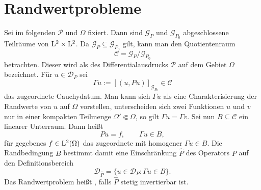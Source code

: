 \section{Randwertprobleme}
Sei im folgenden $\mathcal P$ und $\Omega$ fixiert. Dann sind  $\mathcal G_P$ und $\mathcal G_{P_0}$ abgeschlossene Teilräume von $\mathrm L^2\times\mathrm L^2$. Da
$\mathcal G_P\subseteq \mathcal G_{P_0}$ gilt, kann man den Quotientenraum
\begin{equation}
   \mathcal C = \mathcal G_P / \mathcal G_{P_0}
\end{equation}
betrachten. Dieser wird als  des Differentialausdrucks $\mathcal P$ auf dem Gebiet $\Omega$ bezeichnet. Für $u\in\mathcal D_P$ sei
\begin{equation}
     \Gamma u := [ (u,Pu) ]_{\mathcal G_{P_0}} \in \mathcal C
\end{equation}
das zugeordnete Cauchydatum. Man kann sich $\Gamma u$ als eine Charakterisierung der Randwerte von $u$ auf $\Omega$ vorstellen, unterscheiden sich zwei Funktionen $u$ und $v$ nur in einer kompakten Teilmenge $\Omega' \Subset \Omega$, so gilt $\Gamma u=\Gamma v$.
Sei nun $B\subseteq\mathcal C$ ein linearer Unterraum. Dann heißt 
\begin{equation}
    Pu = f,\qquad \Gamma u\in B,
\end{equation}
f\"ur gegebenes $f\in\mathrm L^2(\Omega)$ das zugeordnete  mit homogener  $\Gamma u\in B$. Die Randbedingung 
$B$ bestimmt damit eine Einschr\"ankung $\widehat P$ des Operators $P$ auf den Definitionsbereich
\begin{equation}
    \mathcal D_{\widehat P} = \{ u \in \mathcal D_P : \Gamma u\in B \}.
\end{equation}
Das Randwertproblem heißt , falls $\widehat P$ stetig invertierbar ist.

